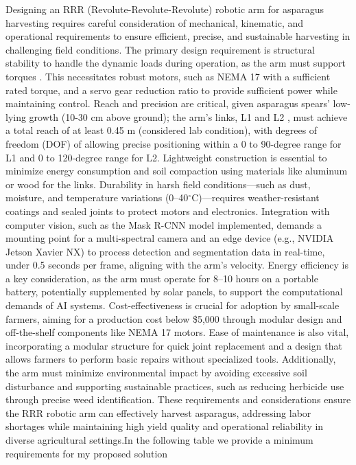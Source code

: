 Designing an RRR (Revolute-Revolute-Revolute) robotic arm for asparagus harvesting requires careful consideration of mechanical, kinematic, and operational requirements to ensure efficient, precise, and sustainable harvesting in challenging field conditions. The primary design requirement is structural stability to handle the dynamic loads during operation, as the arm must support torques . This necessitates robust motors, such as NEMA 17 with a sufficient rated torque, and a servo gear reduction ratio to provide sufficient power while maintaining control. Reach and precision are critical, given asparagus spears’ low-lying growth (10-30 cm above ground); the arm’s links, L1  and L2 , must achieve a total reach of at least 0.45 m (considered lab condition), with degrees of freedom (DOF) of allowing precise positioning within a 0 to 90-degree range for L1 and 0 to 120-degree range for L2. Lightweight construction is essential to minimize energy consumption and soil compaction using materials like aluminum or wood for the links. Durability in harsh field conditions---such as dust, moisture, and temperature variations (0--40$^\circ$C)---requires weather-resistant coatings and sealed joints to protect motors and electronics. Integration with computer vision, such as the Mask R-CNN model implemented, demands a mounting point for a multi-spectral camera and an edge device (e.g., NVIDIA Jetson Xavier NX) to process detection and segmentation data in real-time, under 0.5 seconds per frame, aligning with the arm’s velocity. Energy efficiency is a key consideration, as the arm must operate for 8--10 hours on a portable battery, potentially supplemented by solar panels, to support the computational demands of AI systems. Cost-effectiveness is crucial for adoption by small-scale farmers, aiming for a production cost below \$5,000 through modular design and off-the-shelf components like NEMA 17 motors. Ease of maintenance is also vital, incorporating a modular structure for quick joint replacement and a design that allows farmers to perform basic repairs without specialized tools. Additionally, the arm must minimize environmental impact by avoiding excessive soil disturbance and supporting sustainable practices, such as reducing herbicide use through precise weed identification. These requirements and considerations ensure the RRR robotic arm can effectively harvest asparagus, addressing labor shortages while maintaining high yield quality and operational reliability in diverse agricultural settings.In the following table we provide a minimum requirements for my proposed solution



